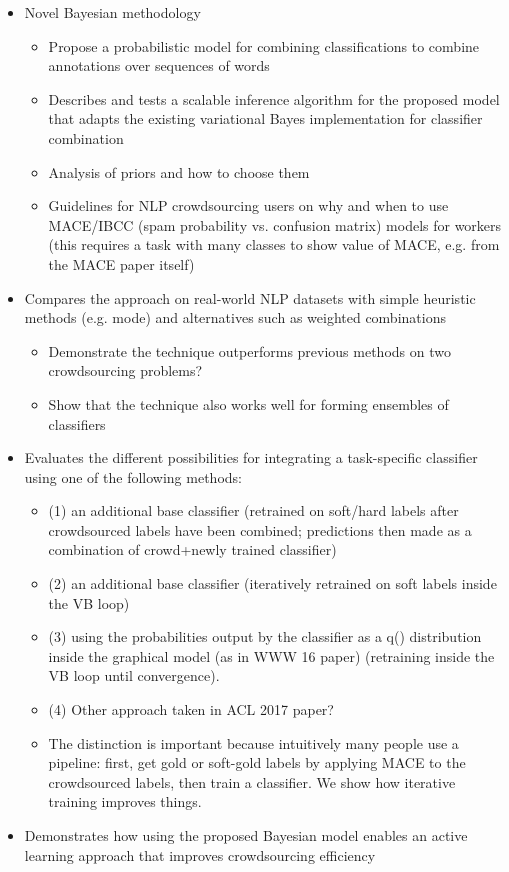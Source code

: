 \begin{itemize}
  \item Novel Bayesian methodology
  \begin{itemize}
     \item Propose a probabilistic model for combining classifications to combine annotations over sequences of words
     \item Describes and tests a scalable inference algorithm for the proposed model that adapts the existing variational Bayes implementation for classifier combination
     \item Analysis of priors and how to choose them
     \item Guidelines for NLP crowdsourcing users on why and when to use MACE/IBCC (spam probability vs. confusion matrix) models for workers (this requires a task with many classes to show value of MACE, e.g. from the MACE paper itself)
  \end{itemize}
  \item Compares the approach on real-world NLP datasets with simple heuristic methods (e.g. mode) and alternatives such as weighted combinations
  \begin{itemize}
     \item Demonstrate the technique outperforms previous methods on two crowdsourcing problems?
     \item Show that the technique also works well for forming ensembles of classifiers
  \end{itemize}
  \item Evaluates the different possibilities for integrating a task-specific classifier using one of the following methods:
  \begin{itemize}
     \item (1) an additional base classifier (retrained on soft/hard labels after crowdsourced labels have been combined; predictions then made as a combination of crowd+newly trained classifier)
     \item (2) an additional base classifier (iteratively retrained on soft labels inside the VB loop)
     \item (3) using the probabilities output by the classifier as a q() distribution inside the graphical model (as in WWW 16 paper) (retraining inside the VB loop until convergence). 
     \item (4) Other approach taken in ACL 2017 paper?
     \item The distinction is important because intuitively many people use a pipeline: first, get gold or soft-gold labels by applying MACE to the crowdsourced labels, then train a classifier. We show how iterative training improves things. 
  \end{itemize} 
  \item Demonstrates how using the proposed Bayesian model enables an active learning approach that improves crowdsourcing efficiency
\end{itemize}

